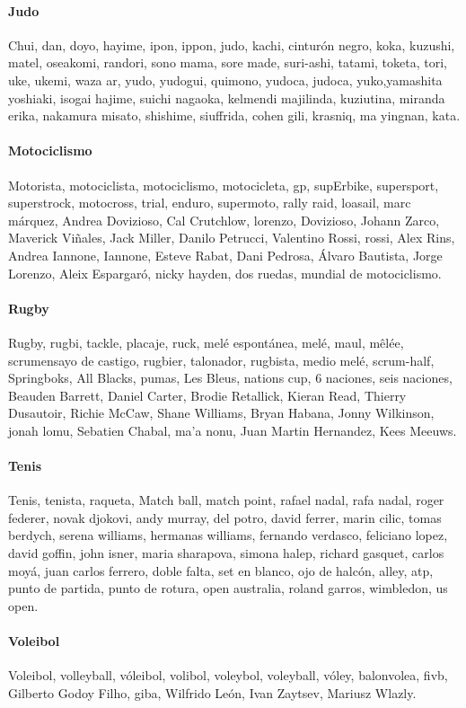 \documentclass[../all.tex]{subfiles}
\begin{document}
    \paragraph{Judo}
    Chui, dan, doyo, hayime, ipon, ippon, judo, kachi, cinturón negro, koka, kuzushi, matel, oseakomi, randori, sono mama, sore made, suri-ashi, tatami, toketa, tori, uke, ukemi, waza ar, yudo, yudogui, quimono, yudoca, judoca, yuko,yamashita yoshiaki, isogai hajime, suichi nagaoka, kelmendi majilinda, kuziutina, miranda erika, nakamura misato, shishime, siuffrida, cohen gili, krasniq, ma yingnan, kata.
    \paragraph{Motociclismo}
    Motorista, motociclista, motociclismo, motocicleta, gp, supErbike, supersport, superstrock, motocross, trial, enduro, supermoto, rally raid, loasail, marc márquez, Andrea Dovizioso, Cal Crutchlow, lorenzo, Dovizioso, Johann Zarco, Maverick Viñales, Jack Miller, Danilo Petrucci, Valentino Rossi, rossi, Alex Rins, Andrea Iannone, Iannone, Esteve Rabat, Dani Pedrosa, Álvaro Bautista, Jorge Lorenzo, Aleix Espargaró, nicky hayden, dos ruedas, mundial de motociclismo.
    \paragraph{Rugby}
    Rugby, rugbi, tackle, placaje, ruck, melé espontánea, melé, maul, mêlée, scrumensayo de castigo, rugbier, talonador, rugbista, medio melé, scrum-half, Springboks, All Blacks, pumas, Les Bleus, nations cup, 6 naciones, seis naciones, Beauden Barrett, Daniel Carter, Brodie Retallick, Kieran Read, Thierry Dusautoir, Richie McCaw, Shane Williams, Bryan Habana, Jonny Wilkinson, jonah lomu, Sebatien Chabal, ma'a nonu, Juan Martin Hernandez, Kees Meeuws.
    \paragraph{Tenis}
    Tenis, tenista, raqueta, Match ball, match point, rafael nadal, rafa nadal, roger federer, novak djokovi, andy murray, del potro, david ferrer, marin cilic, tomas berdych, serena williams, hermanas williams, fernando verdasco, feliciano lopez, david goffin, john isner, maria sharapova, simona halep, richard gasquet, carlos moyá, juan carlos ferrero, doble falta, set en blanco, ojo de halcón, alley, atp, punto de partida, punto de rotura, open australia, roland garros, wimbledon, us open.
    \paragraph{Voleibol}
    Voleibol, volleyball, vóleibol, volibol, voleybol, voleyball, vóley, balonvolea, fivb, Gilberto Godoy Filho, giba, Wilfrido León, Ivan Zaytsev, Mariusz Wlazly.
\newpage
\end{document}
